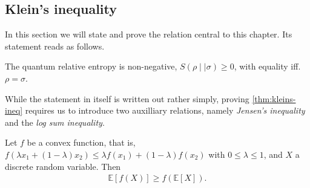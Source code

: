 \subsection{Klein's inequality}
In this section we will state and prove the relation central to this chapter.
Its statement reads as follows.
\begin{thm}\label{thm:kleins-ineq}
  The quantum relative entropy is non-negative, $S(\rho\mid\mid\sigma)\geq 0$, with equality iff.
  $\rho=\sigma$.
\end{thm}
While the statement in itself is written out rather simply, proving
\cref{thm:kleins-ineq} requires
us to introduce two auxilliary relations, namely \emph{Jensen's inequality} and
the \emph{log sum inequality}.
\begin{thm}\label{thm:jensen}
  Let $f$ be a convex function, that is, $f\left(\lambda x_1 + \left(
  1-\lambda \right)x_2\right) \leq \lambda f\left( x_1 \right) + \left(
  1-\lambda \right) f(x_2)$ with $0\leq\lambda\leq1$, and $X$ a discrete random
  variable. Then
  \begin{align}
    \mathbb{E}\left[f(X)\right] \geq f\left( \mathbb{E}\left[X\right] \right)
  .\end{align}
\end{thm}
